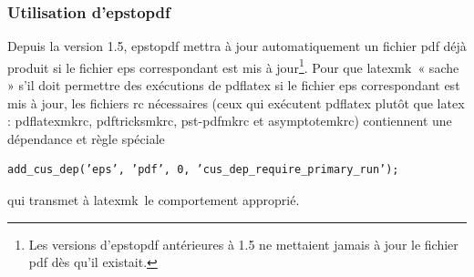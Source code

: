 \documentclass[11pt,french]{article}
\newcommand{\latexmk}{\textsf{latexmk}}
\newcommand{\cmd}[1]{\textsf{#1}}
\begin{document}
%
%

\subsubsection{Utilisation d'\cmd{epstopdf}}

Depuis la version 1.5, \cmd{epstopdf} mettra à jour automatiquement un fichier \cmd{pdf} déjà produit si le fichier \cmd{eps} correspondant est mis à jour\footnote{Les versions d'\cmd{epstopdf} antérieures à 1.5 ne mettaient jamais à jour le fichier \cmd{pdf} dès qu'il existait.}. Pour que \latexmk\ « sache » s'il doit permettre des exécutions de \cmd{pdflatex} si le fichier \cmd{eps} correspondant est mis à jour, les fichiers \cmd{rc} nécessaires (ceux qui exécutent \cmd{pdflatex} plutôt que \cmd{latex} : \cmd{pdflatexmkrc}, \cmd{pdftricksmkrc}, \cmd{pst-pdfmkrc} et \cmd{asymptotemkrc}) contiennent une dépendance et règle spéciale

\begin{verbatim}
add_cus_dep(’eps’, ’pdf’, 0, ’cus_dep_require_primary_run’);
\end{verbatim}
qui transmet à \latexmk\ le comportement approprié.
\end{document}
